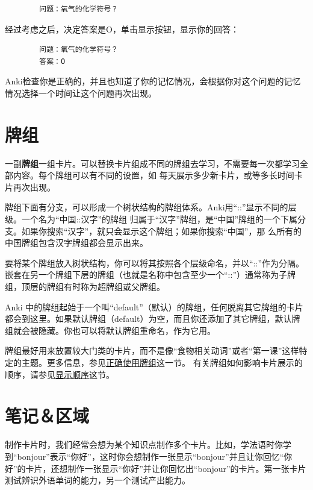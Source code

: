 \documentclass[a4paper]{book}
\begin{document}
	\begin{shaded}\begin{verbatim}
		问题：氧气的化学符号？
		\end{verbatim}\end{shaded}
	经过考虑之后，决定答案是O，单击显示按钮，显示你的回答：
	\begin{shaded}\begin{verbatim}
		问题：氧气的化学符号？
		答案：O
		\end{verbatim}\end{shaded}
	Anki检查你是正确的，并且也知道了你的记忆情况，会根据你对这个问题的记忆情况选择一个时间让这个问题再次出现。
	
	\section{牌组}
	一副\textbf{牌组}一组卡片。可以替换卡片组成不同的牌组去学习，不需要每一次都学习全部内容。每个牌组可以有不同的设置，如 每天展示多少新卡片，或等多长时间卡片再次出现。
	
	牌组下面有分支，可以形成一个树状结构的牌组体系。Anki用“::”显示不同的层级。一个名为“中国::汉字”的牌组 归属于“汉字”牌组，是“中国”牌组的一个下属分支。如果你搜索“汉字”，就只会显示这个牌组；如果你搜索“中国”，那 么所有的中国牌组包含汉字牌组都会显示出来。
	
	要将某个牌组放入树状结构，你可以将其按照各个层级命名，并以“::”作为分隔。嵌套在另一个牌组下层的牌组（也就是名称中包含至少一个“::”）通常称为子牌组，顶层的牌组有时称为超牌组或父牌组。
	
	Anki 中的牌组起始于一个叫“default”（默认）的牌组，任何脱离其它牌组的卡片都会到这里。如果默认牌组（default）为空，而且你还添加了其它牌组，默认牌组就会被隐藏。你也可以将默认牌组重命名，作为它用。
	
	牌组最好用来放置较大门类的卡片，而不是像“食物相关动词”或者“第一课”这样特定的主题。更多信息，参见\hyperref[manydecks]{正确使用牌组}这一节。
	有关牌组如何影响卡片展示的顺序，请参见\hyperref[displayorder]{显示顺序}这节。
	
	\section{笔记＆区域}
	
	制作卡片时，我们经常会想为某个知识点制作多个卡片。比如，学法语时你学到“bonjour”表示“你好”，这时你会想制作一张显示“bonjour”并且让你回忆“你好”的卡片，还想制作一张显示“你好”并让你回忆出“bonjour”的卡片。第一张卡片测试辨识外语单词的能力，另一个测试产出能力。
	
\end{document}
